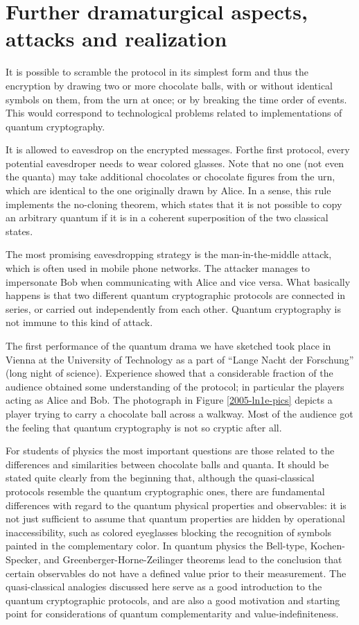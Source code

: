 \documentclass[prb,amssymb,preprint]{revtex4}
\begin{document}
\section{Further dramaturgical aspects, attacks and realization}

It is possible to scramble the protocol in its simplest form and thus the
encryption by drawing two or more chocolate balls, with or without identical
symbols on them, from the urn at once; or by breaking the time order of
events.
This would correspond to technological problems related to
implementations of quantum cryptography.

It is allowed to eavesdrop on the encrypted
messages. Forthe first protocol, every potential eavesdroper needs
to wear colored glasses. Note that no one (not even
the quanta) may take additional chocolates or chocolate figures from the
urn, which are identical to the one originally drawn by Alice.
In a sense, this rule implements the no-cloning theorem, which states that
it is not possible to copy an arbitrary quantum if it is in a coherent
superposition of the two classical states.

The most promising eavesdropping strategy is the man-in-the-middle
attack, which is often used in mobile phone networks.
The attacker manages to impersonate Bob when communicating with Alice and
vice versa. What basically happens is that two different quantum
cryptographic protocols are connected in series, or carried out
independently from each other. Quantum cryptography is not immune to this
kind of attack.

The first performance of the quantum drama we have sketched took place
in Vienna at the University of Technology as a part of
``Lange Nacht der Forschung'' (long night of science). Experience showed
that a considerable fraction of the audience obtained some understanding of
the protocol; in particular the players acting as Alice and Bob. The photograph in Figure \ref{2005-ln1e-pics} depicts a player trying to carry
a chocolate ball across a walkway.
Most
of the audience got the feeling that quantum cryptography is not so
cryptic after all.

For students of physics the most important questions
are those related to the differences and similarities between chocolate balls
and quanta.
It should be stated quite clearly from the beginning that,
although the quasi-classical protocols resemble the quantum cryptographic
ones, there are fundamental differences
with regard to the quantum physical properties and observables:
it is not just sufficient to assume that quantum properties are hidden
by operational inaccessibility, such as colored eyeglasses
blocking the recognition of symbols painted in the complementary color.
In quantum physics the Bell-type, Kochen-Specker,
and Greenberger-Horne-Zeilinger theorems\cite{mermin-93}
lead to the conclusion that certain observables do not
have a defined value prior to their measurement.
The quasi-classical analogies discussed here serve
as a good introduction to the quantum cryptographic protocols,
and are also a good motivation and starting point
for considerations of quantum complementarity and value-indefiniteness.
\end{document}
